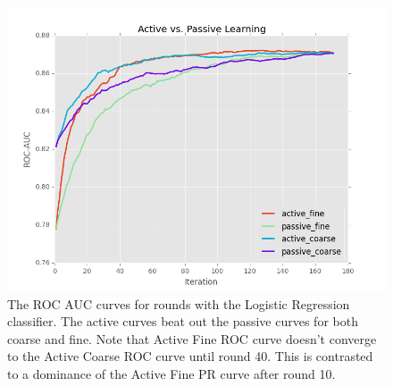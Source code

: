 \documentclass[ms]{nuthesis}
\begin{document}
\FloatBarrier
\begin{figure}[!htb]
	\centering
    \includegraphics[width=1.0\columnwidth]{fig/runActPassLogReg_roc}
    \caption{The ROC AUC curves for rounds with the
Logistic Regression classifier. The active curves beat out the passive
curves for both coarse and fine. Note that Active Fine ROC curve doesn't
converge to the Active Coarse ROC curve until round 40. This is contrasted
to a dominance of the Active Fine PR curve after round 10.}
\label{fig:runActPassLogReg_roc}
\end{figure}
\FloatBarrier
\end{document}
